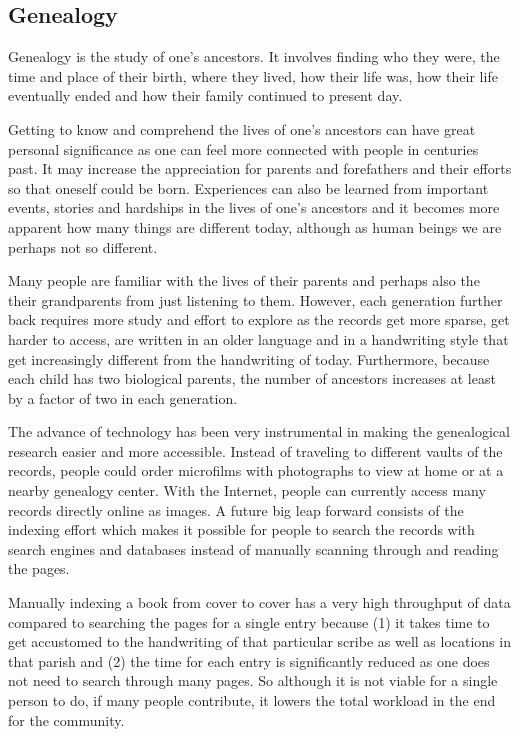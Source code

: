 
\subsection{Genealogy}

Genealogy is the study of one's ancestors. It involves finding who they were, the time and place of their birth, where they lived, how their life was, how their life eventually ended and how their family continued to present day.

Getting to know and comprehend the lives of one's ancestors can have great personal significance as one can feel more connected with people in centuries past. It may increase the appreciation for parents and forefathers and their efforts so that oneself could be born.
Experiences can also be learned from important events, stories and hardships in the lives of one's ancestors and
it becomes more apparent
how many things are different today, although as human beings we are perhaps not so different.

Many people are familiar with the lives of their parents and perhaps also the their grandparents from just listening to them.
However, each generation further back requires more study and effort to explore as the records get more sparse, get harder to access, are written in an older language and in a handwriting style that get increasingly different from the handwriting of today. Furthermore, because each child has two biological parents, the number of ancestors increases at least by a factor of two in each generation.

The advance of technology has been very instrumental in making the genealogical research easier and more accessible. Instead of traveling to different vaults of the records, people could order microfilms with photographs to view at home or at a nearby genealogy center. With the Internet, people can currently access many records directly online as images. A future big leap forward consists of the indexing effort which makes it possible for people to search the records with search engines and databases instead of manually scanning through and reading the pages.

Manually indexing a book from cover to cover has a very high throughput of data compared to searching the pages for a single entry because (1) it takes time to get accustomed to the handwriting of that particular scribe as well as locations in that parish and (2) the time for each entry is significantly reduced as one does not need to search through many pages. So although it is not viable for a single person to do, if many people contribute, it lowers the total workload in the end for the community.

